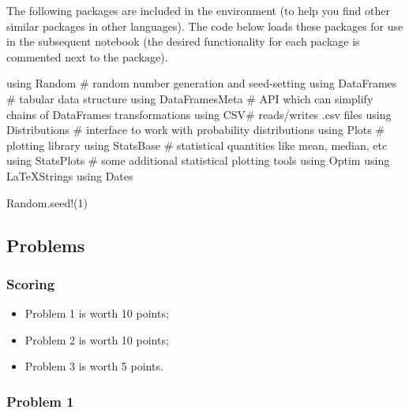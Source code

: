\documentclass[
  letterpaper,
  DIV=11,
  numbers=noendperiod]{scrartcl}
\newenvironment{Shaded}{\begin{snugshade}}{\end{snugshade}}
\newcommand{\BuiltInTok}[1]{\textcolor[rgb]{0.00,0.23,0.31}{#1}}
\newcommand{\CommentTok}[1]{\textcolor[rgb]{0.37,0.37,0.37}{#1}}
\newcommand{\FloatTok}[1]{\textcolor[rgb]{0.68,0.00,0.00}{#1}}
\newcommand{\FunctionTok}[1]{\textcolor[rgb]{0.28,0.35,0.67}{#1}}
\newcommand{\ImportTok}[1]{\textcolor[rgb]{0.00,0.46,0.62}{#1}}
\newcommand{\NormalTok}[1]{\textcolor[rgb]{0.00,0.23,0.31}{#1}}
\providecommand{\tightlist}{%
  \setlength{\itemsep}{0pt}\setlength{\parskip}{0pt}}\usepackage{longtable,booktabs,array}
\begin{document}
The following packages are included in the environment (to help you find
other similar packages in other languages). The code below loads these
packages for use in the subsequent notebook (the desired functionality
for each package is commented next to the package).

\begin{Shaded}
\begin{Highlighting}[]
\ImportTok{using} \BuiltInTok{Random} \CommentTok{\# random number generation and seed{-}setting}
\ImportTok{using} \BuiltInTok{DataFrames} \CommentTok{\# tabular data structure}
\ImportTok{using} \BuiltInTok{DataFramesMeta} \CommentTok{\# API which can simplify chains of DataFrames transformations}
\ImportTok{using} \BuiltInTok{CSV\#}\NormalTok{ reads/writes .csv files}
\ImportTok{using} \BuiltInTok{Distributions} \CommentTok{\# interface to work with probability distributions}
\ImportTok{using} \BuiltInTok{Plots} \CommentTok{\# plotting library}
\ImportTok{using} \BuiltInTok{StatsBase} \CommentTok{\# statistical quantities like mean, median, etc}
\ImportTok{using} \BuiltInTok{StatsPlots} \CommentTok{\# some additional statistical plotting tools}
\ImportTok{using} \BuiltInTok{Optim}
\ImportTok{using} \BuiltInTok{LaTeXStrings}
\ImportTok{using} \BuiltInTok{Dates}

\BuiltInTok{Random}\NormalTok{.}\FunctionTok{seed!}\NormalTok{(}\FloatTok{1}\NormalTok{)}
\end{Highlighting}
\end{Shaded}

\subsection{Problems}\label{problems}

\subsubsection{Scoring}\label{scoring}

\begin{itemize}
\tightlist
\item
  Problem 1 is worth 10 points;
\item
  Problem 2 is worth 10 points;
\item
  Problem 3 is worth 5 points.
\end{itemize}

\subsubsection{Problem 1}\label{problem-1}
\end{document}

